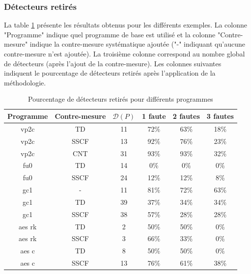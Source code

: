             \subsubsection{Détecteurs retirés}
            \label{sec:ch6:exp:results}
                
                La table \ref{tbl:ch6:exp:ccpo-all} présente les résultats obtenus pour les différents exemples.
                La colonne "Programme" indique quel programme de base est utilisé et la colonne "Contre-mesure" indique la contre-mesure systématique ajoutée ("-" indiquant qu'aucune contre-mesure n'est ajoutée). 
                La troisième colonne correspond au nombre global de détecteurs (après l'ajout de la contre-mesure).
                Les colonnes suivantes indiquent le pourcentage de détecteurs retirés après l'application de la méthodologie.
                         
                \begin{table}[htbp]
                \caption{Pourcentage de détecteurs retirés pour différents programmes}\label{tbl:ch6:exp:ccpo-all}
                \begin{center}
                \begin{tabular}{cc|c|ccc}
                    Programme & Contre-mesure & $\mathcal{D}(P)$ & 1 faute   & 2 fautes   & 3 fautes   \\
                    \hline
                    \hline
                    vp2c       & TD            & 11         & 72\% & 63\% & 18\% \\
                    vp2c       & SSCF          & 13         & 92\% & 76\% & 23\% \\
                    vp2c       & CNT           & 31         & 93\% & 93\% & 32\% \\
                    \hline
                    fu0       & TD            & 14         & 0\%  & 0\%  & 0\%  \\
                    fu0       & SSCF          & 24         & 12\% & 12\% & 8\%  \\
                    \hline
                    gc1       & -             & 11         & 81\% & 72\% & 63\% \\
                    gc1       & TD            & 39         & 37\% & 34\% & 34\% \\
                    gc1       & SSCF          & 38         & 57\% & 28\% & 28\% \\
                    \hline
                    aes rk    & TD            & 2          & 50\% & 50\% & 0\%  \\
                    aes rk    & SSCF          & 3          & 66\% & 33\% & 0\%  \\
                    \hline
                    aes c     & TD            & 8          & 50\% & 50\% & 0\%  \\
                    aes c     & SSCF          & 13         & 76\% & 61\% & 38\%
                    \end{tabular}
                \end{center}
                \end{table} 
                        
